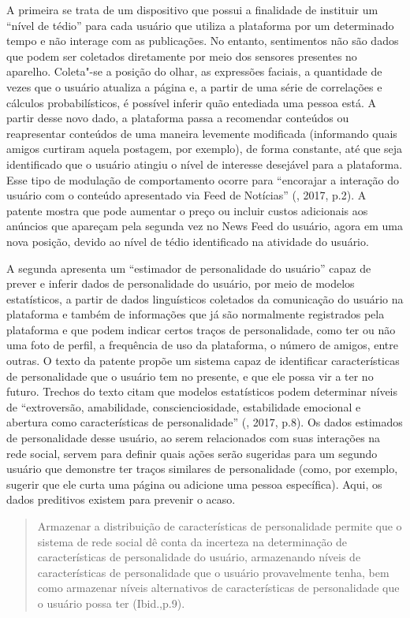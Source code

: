 A primeira se trata de um dispositivo que possui a finalidade de
instituir um ``nível de tédio'' para cada usuário que utiliza a
plataforma por um determinado tempo e não interage com as publicações.
No entanto, sentimentos não são dados que podem ser coletados
diretamente por meio dos sensores presentes no aparelho. Coleta"-se a
posição do olhar, as expressões faciais, a quantidade de vezes que o
usuário atualiza a página e, a partir de uma série de correlações e
cálculos probabilísticos, é possível inferir quão entediada uma pessoa
está. A partir desse novo dado, a plataforma passa a recomendar
conteúdos ou reapresentar conteúdos de uma maneira levemente modificada
(informando quais amigos curtiram aquela postagem, por exemplo), de
forma constante, até que seja identificado que o usuário atingiu o nível
de interesse desejável para a plataforma. Esse tipo de modulação de
comportamento ocorre para ``encorajar a interação do usuário com o
conteúdo apresentado via Feed de Notícias'' (, 2017, p.2). A
patente mostra que pode aumentar o preço ou incluir custos adicionais
aos anúncios que apareçam pela segunda vez no News Feed do usuário,
agora em uma nova posição, devido ao nível de tédio identificado na
atividade do usuário.

A segunda apresenta um ``estimador de personalidade do usuário'' capaz
de prever e inferir dados de personalidade do usuário, por meio de
modelos estatísticos, a partir de dados linguísticos coletados da
comunicação do usuário na plataforma e também de informações que já são
normalmente registrados pela plataforma e que podem indicar certos
traços de personalidade, como ter ou não uma foto de perfil, a
frequência de uso da plataforma, o número de amigos, entre outras. O
texto da patente propõe um sistema capaz de identificar características
de personalidade que o usuário tem no presente, e que ele possa vir a
ter no futuro. Trechos do texto citam que modelos estatísticos podem
determinar níveis de ``extroversão, amabilidade, conscienciosidade,
estabilidade emocional e abertura como características de
personalidade'' (, 2017, p.8). Os dados estimados de
personalidade desse usuário, ao serem relacionados com suas interações
na rede social, servem para definir quais ações serão sugeridas para um
segundo usuário que demonstre ter traços similares de personalidade
(como, por exemplo, sugerir que ele curta uma página ou adicione uma
pessoa específica). Aqui, os dados preditivos existem para prevenir o
acaso.

\begin{quote}
Armazenar a distribuição de características de personalidade permite que
o sistema de rede social dê conta da incerteza na determinação de
características de personalidade do usuário, armazenando níveis de
características de personalidade que o usuário provavelmente tenha, bem
como armazenar níveis alternativos de características de personalidade
que o usuário possa ter (Ibid.,p.9).
\end{quote}

